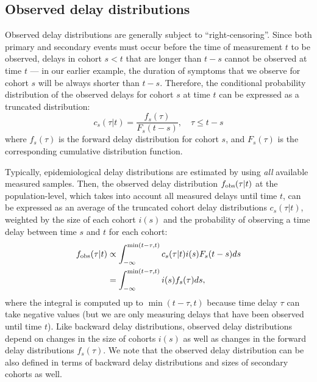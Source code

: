 \documentclass[12pt]{article}
\begin{document}
\subsection{Observed delay distributions}

Observed delay distributions are generally subject to ``right-censoring''.
Since both primary and secondary events must occur before the time of measurement $t$ to be observed, delays in cohort $s < t$ that are longer than $t-s$ cannot be observed at time $t$ --- 
in our earlier example, the duration of symptoms that we observe for cohort $s$ will be always shorter than $t-s$.
Therefore, the conditional probability distribution of the observed delays for cohort $s$ at time $t$ can be expressed as a truncated distribution:
\begin{equation}
c_s(\tau|t) = \frac{f_s(\tau)}{F_s(t-s)},\quad \tau \leq t-s
\label{eq:cohort}
\end{equation}
where $f_s(\tau)$ is the forward delay distribution for cohort $s$,
and $F_s(\tau)$ is the corresponding cumulative distribution function.

Typically, epidemiological delay distributions are estimated by using \emph{all} available measured samples.
Then, the observed delay distribution $f_{\tiny\textrm{obs}}(\tau|t)$ at the population-level, which takes into account all measured delays until time $t$, can be expressed as an average of the truncated cohort delay distributions $c_s(\tau|t)$, weighted by the size of each cohort $i(s)$ and the probability of observing a time delay between time $s$ and $t$ for each cohort:
\begin{equation}
\begin{aligned}
f_{\tiny\textrm{obs}}(\tau|t) &\propto \int_{-\infty}^{\min(t-\tau,t)} c_s(\tau|t) i(s) F_s(t-s) ds\\
&= \int_{-\infty}^{\min(t-\tau,t)} i(s) f_s(\tau) ds,
\end{aligned}
\end{equation}
where the integral is computed up to $\min(t-\tau,t)$ because time delay $\tau$ can take negative values (but we are only measuring delays that have been observed until time $t$).
Like backward delay distributions, observed delay distributions depend on changes in the size of cohorts $i(s)$ as well as changes in the forward delay distributions $f_s(\tau)$.
We note that the observed delay distribution can be also defined in terms of backward delay distributions and sizes of secondary cohorts as well.
\end{document}

